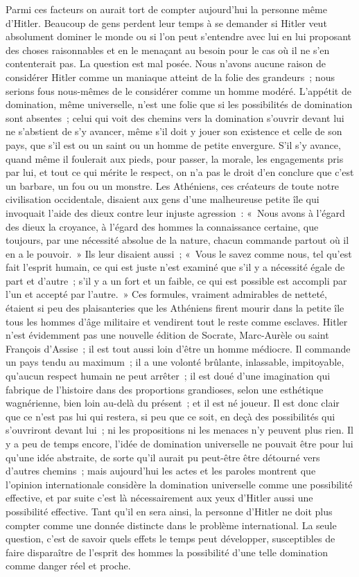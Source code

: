 \documentclass[french,twoside]{book} %
\begin{document}
Parmi ces facteurs on aurait tort de compter aujourd'hui la personne même d'Hitler. Beaucoup de gens perdent leur temps à se demander si Hitler veut absolument dominer le monde ou si l'on peut s'entendre avec lui en lui proposant des choses raisonnables et en le menaçant au besoin pour le cas où il ne s'en contenterait pas. La question est mal posée. Nous n'avons aucune raison de considérer Hitler comme un maniaque atteint de la folie des grandeurs ; nous serions fous nous-mêmes de le considérer comme un homme modéré. L'appétit de domination, même universelle, n'est une folie que si les possibilités de domination sont absentes ; celui qui voit des chemins vers la domination s'ouvrir devant lui ne s'abstient de s'y avancer, même s'il doit y jouer son existence et celle de son pays, que s'il est ou un saint ou un homme de petite envergure. S'il s'y avance, quand même il foulerait aux pieds, pour passer, la morale, les engagements pris par lui, et tout ce qui mérite le respect, on n'a pas le droit d'en conclure que c'est un barbare, un fou ou un monstre. Les Athéniens, ces créateurs de toute notre civilisation occidentale, disaient aux gens d'une malheureuse petite île qui invoquait l'aide des dieux contre leur injuste agression : « Nous avons à l'égard des dieux la croyance, à l'égard des hommes la connaissance certaine, que toujours, par une nécessité absolue de la nature, chacun commande partout où il en a le pouvoir. » Ils leur disaient aussi ; « Vous le savez comme nous, tel qu'est fait l'esprit humain, ce qui est juste n'est examiné que s'il y a nécessité égale de part et d'autre ; s'il y a un fort et un faible, ce qui est possible est accompli par l'un et accepté par l'autre. » Ces formules, vraiment admirables de netteté, étaient si peu des plaisanteries que les Athéniens firent mourir dans la petite île tous les hommes d'âge militaire et vendirent tout le reste comme esclaves. Hitler n'est évidemment pas une nouvelle édition de Socrate, Marc-Aurèle ou saint François d'Assise ; il est tout aussi loin d'être un homme médiocre. Il commande un pays tendu au maximum ; il a une volonté brûlante, inlassable, impitoyable, qu'aucun respect humain ne peut arrêter ; il est doué d'une imagination qui fabrique de l'histoire dans des proportions grandioses, selon une esthétique wagnérienne, bien loin au-delà du présent ; et il est né joueur. Il est donc clair que ce n'est pas lui qui restera, si peu que ce soit, en deçà des possibilités qui s'ouvriront devant lui ; ni les propositions ni les menaces n'y peuvent plus rien. Il y a peu de temps encore, l'idée de domination universelle ne pouvait être pour lui qu'une idée abstraite, de sorte qu'il aurait pu peut-être être détourné vers d'autres chemins ; mais aujourd'hui les actes et les paroles montrent que l'opinion internationale considère la domination universelle comme une possibilité effective, et par suite c'est là nécessairement aux yeux d'Hitler aussi une possibilité effective. Tant qu'il en sera ainsi, la personne d'Hitler ne doit plus compter comme une donnée distincte dans le problème international. La seule question, c'est de savoir quels effets le temps peut développer, susceptibles de faire disparaître de l'esprit des hommes la possibilité d'une telle domination comme danger réel et proche.\par
\end{document}
